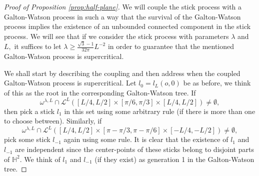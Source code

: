 \documentclass[10pt,a4paper]{amsart}
\newcommand{\BH}{{\mathbb{H}}}
\newcommand{\CL}{{\mathcal{L}}}
\begin{document}
\begin{proof}[Proof of Proposition \ref{prop:half-plane}]
We will couple the stick process with a Galton-Watson process in such a way that 
the survival of the Galton-Watson process implies the existence of an unbounded connected component
in the stick process.
We will see that if we consider the stick process with parameters 
$\lambda$ and $L,$
it suffices to let $\lambda \geq \frac{\sqrt{3}-1}{32 \pi}L^{-2}$ 
in order to guarantee that the mentioned
Galton-Watson process is supercritical.

We shall start by describing the coupling and then address when the coupled Galton-Watson 
process is supercritical.
Let $l_0=l_L(o,0)$ be as before, we think of this as the root in the corresponding 
Galton-Watson tree. 
If 
\[
\omega^{\lambda,L}\cap \CL^L([L/4,L/2]\times [\pi/6,\pi/3]\times [L/4,L/2]) \neq \emptyset,
\]
then pick a stick $l_1$ in this set using some arbitrary rule (if there is more than 
one to choose between). 
Similarly, if 
\[
\omega^{\lambda,L}\cap \CL^L([L/4,L/2]\times [\pi-\pi/3,\pi-\pi/6]\times [-L/4,-L/2]) \neq \emptyset,
\]
pick some stick $l_{-1}$ again using some rule. It is clear that the existence of 
$l_1$ and $l_{-1}$ are independent since the center-points of these sticks belong to disjoint 
parts of $\BH^2.$ We think of $l_1$ and $l_{-1}$ (if they exist) as generation 1 in the 
Galton-Watson tree. 


\end{proof}
\end{document}
